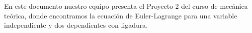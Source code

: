 
\noindent 				%
En este documento nuestro equipo presenta el Proyecto 2 del curso de mecánica teórica, 
donde encontramos la ecuación de Euler-Lagrange para una variable independiente y dos dependientes
con ligadura.